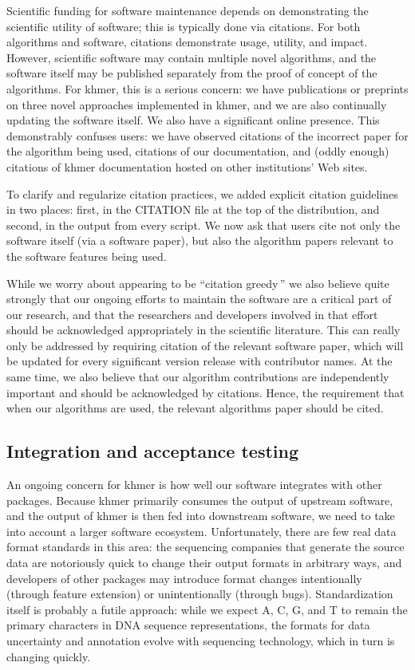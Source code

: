 \documentclass[12pt]{article}
\begin{document}

Scientific funding for software maintenance depends on demonstrating
the scientific utility of software; this is typically done via
citations.  For both algorithms and software, citations demonstrate
usage, utility, and impact.  However, scientific software may contain
multiple novel algorithms, and the software itself may be published
separately from the proof of concept of the algorithms.  For khmer,
this is a serious concern: we have publications or preprints on three
novel approaches implemented in khmer, and we are also continually
updating the software itself.  We also have a significant online
presence. This demonstrably confuses users: we have observed citations
of the incorrect paper for the algorithm being used, citations of our
documentation, and (oddly enough) citations of khmer documentation
hosted on other institutions' Web sites.

To clarify and regularize citation practices, we added explicit
citation guidelines in two places: first, in the CITATION file at the
top of the distribution, and second, in the output from every script.
We now ask that users cite not only the software itself (via a
software paper), but also the algorithm papers relevant to the
software features being used.

While we worry about appearing to be ``citation greedy\,'' we also
believe quite strongly that our ongoing efforts to maintain the
software are a critical part of our research, and that the researchers
and developers involved in that effort should be acknowledged
appropriately in the scientific literature.  This can really only be
addressed by requiring citation of the relevant software paper, which
will be updated for every significant version release with contributor
names.  At the same time, we also believe that our algorithm
contributions are independently important and should be acknowledged
by citations.  Hence, the requirement that when our algorithms are
used, the relevant algorithms paper should be cited.

\subsection{Integration and acceptance testing}

An ongoing concern for khmer is how well our software integrates with
other packages.  Because khmer primarily consumes the output of
upstream software, and the output of khmer is then fed into downstream
software, we need to take into account a larger software ecosystem.
Unfortunately, there are few real data format standards in this area:
the sequencing companies that generate the source data are notoriously
quick to change their output formats in arbitrary ways, and developers
of other packages may introduce format changes intentionally (through
feature extension) or unintentionally (through bugs).  Standardization
itself is probably a futile approach: while we expect A, C, G, and
T to remain the primary characters in DNA sequence representations,
the formats for data uncertainty and annotation evolve with
sequencing technology, which in turn is changing quickly.
\end{document}

